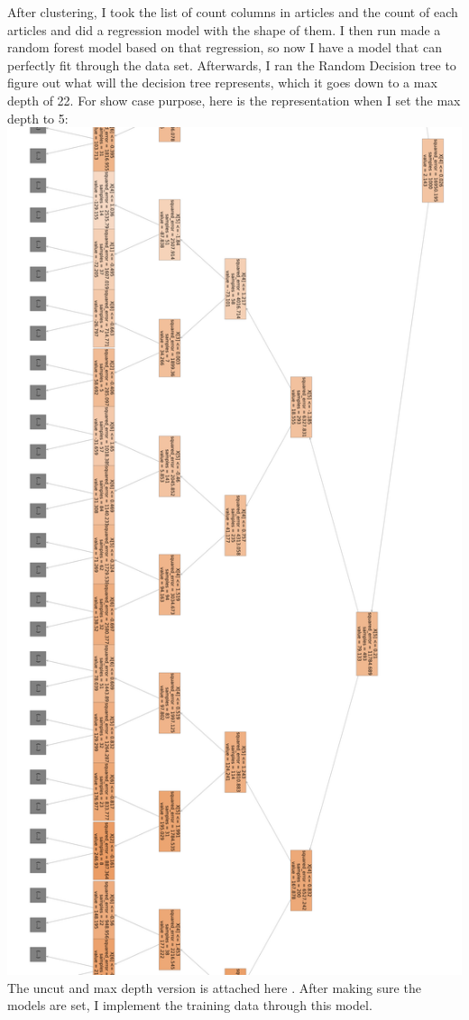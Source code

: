 \documentclass{article}
\begin{document}
After clustering, I took the list of count columns in articles and the count of each articles and did a regression model with the shape of them. I then run made a random forest model based on that regression, so now I have a model that can perfectly fit through the data set. Afterwards, I ran the Random Decision tree to figure out what will the decision tree represents, which it goes down to a max depth of 22. For show case purpose, here is the representation when I set the max depth to 5:\\
\includegraphics[width=\textwidth]{images/finald5.png}
The uncut and max depth version is attached here \cite{rawTree}. After making sure the models are set, I implement the training data through this model.\\
\end{document}
